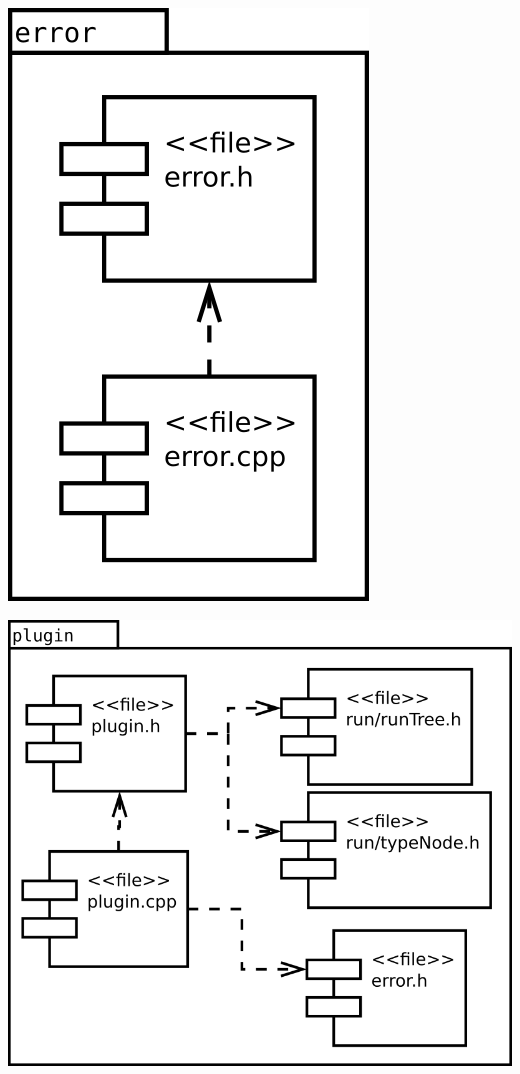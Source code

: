 \begin{multicols}{2}
\begin{center}
\includegraphics[scale=0.3]{files_arquitecture/error.png} \\
\end{center}
\begin{center}
\includegraphics[scale=0.3]{files_arquitecture/plugin.png} \\
\end{center}
\end{multicols}

